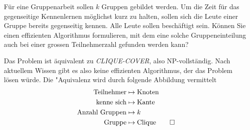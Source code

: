 Für eine Gruppenarbeit sollen $k$ Gruppen gebildet werden.
Um die Zeit für das gegenseitige Kennenlernen möglichst
kurz zu halten, sollen sich die Leute einer Gruppe bereits
gegenseitig kennen. Alle Leute sollen beschäftigt sein.
Können Sie einen effizienten Algorithmus
formulieren, mit dem eine solche Gruppeneinteilung auch bei
einer grossen Teilnehmerzahl gefunden werden kann?


\begin{loesung}
Das Problem ist äquivalent zu \textsl{CLIQUE-COVER}, also
NP-vollständig. Nach aktuellem Wissen gibt es also keine
effizienten Algorithmus, der das Problem lösen würde. Die
"Aquivalenz wird durch folgende Abbildung vermittelt
\begin{align*}
\text{Teilnehmer}&\mapsto\text{Knoten}\\
\text{kenne sich}&\mapsto\text{Kante}\\
\text{Anzahl Gruppen}&\mapsto k\\
\text{Gruppe}&\mapsto\text{Clique}
\qedhere
\end{align*}
\end{loesung}
